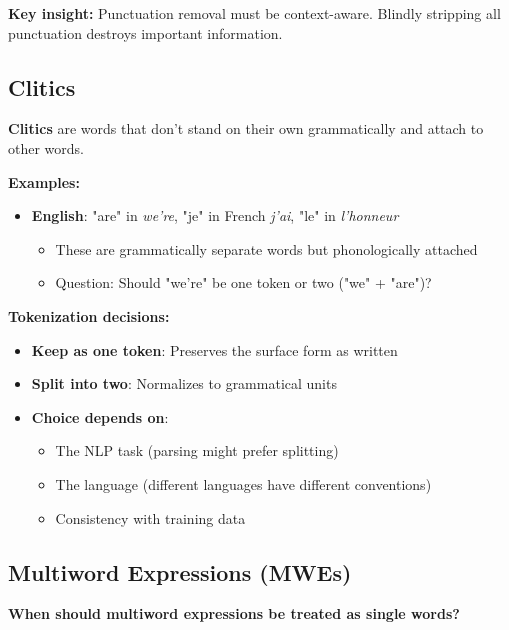 \documentclass[11pt,a4paper]{article}
\theoremstyle{definition}
\theoremstyle{plain}
\theoremstyle{remark}
\begin{document}
\textbf{Key insight:} Punctuation removal must be context-aware. Blindly stripping all punctuation destroys important information.

\subsection{Clitics}

\textbf{Clitics} are words that don't stand on their own grammatically and attach to other words.

\textbf{Examples:}
\begin{itemize}
    \item \textbf{English}: "are" in \textit{we're}, "je" in French \textit{j'ai}, "le" in \textit{l'honneur}
    \begin{itemize}
        \item These are grammatically separate words but phonologically attached
        \item Question: Should "we're" be one token or two ("we" + "are")?
    \end{itemize}
\end{itemize}

\textbf{Tokenization decisions:}
\begin{itemize}
    \item \textbf{Keep as one token}: Preserves the surface form as written
    \item \textbf{Split into two}: Normalizes to grammatical units
    \item \textbf{Choice depends on}:
    \begin{itemize}
        \item The NLP task (parsing might prefer splitting)
        \item The language (different languages have different conventions)
        \item Consistency with training data
    \end{itemize}
\end{itemize}

\subsection{Multiword Expressions (MWEs)}

\textbf{When should multiword expressions be treated as single words?}
\end{document}
